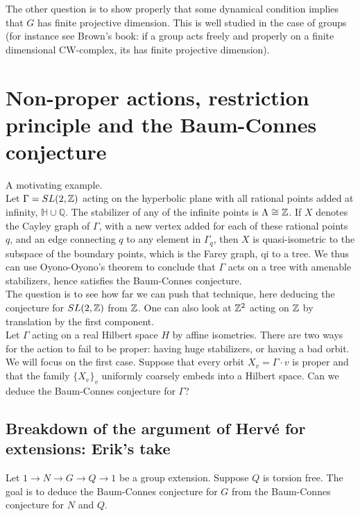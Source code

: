 The other question is to show properly that some dynamical condition implies that $G$ has finite projective dimension. This is well studied in the case of groups (for instance see Brown's book: if a group acts freely and properly on a finite dimensional CW-complex, its has finite projective dimension).
\newpage
\section{Non-proper actions, restriction principle and the Baum-Connes conjecture}  %

A motivating example.\\

Let $\Gamma = SL(2, \mathbb Z)$ acting on the hyperbolic plane with all rational points added at infinity, $\mathbb H \cup \mathbb Q$. The stabilizer of any of the infinite points is $\Lambda \cong \mathbb Z$. If $X$ denotes the Cayley graph of $\Gamma$, with a new vertex added for each of these rational points $q$, and an edge connecting $q$ to any element in $\Gamma_q$, then $X$ is quasi-isometric to the subspace of the boundary points, which is the Farey graph, qi to a tree. We thus can use Oyono-Oyono's theorem to conclude that $\Gamma$ acts on a tree with amenable stabilizers, hence satisfies the Baum-Connes conjecture.\\

The question is to see how far we can push that technique, here deducing the conjecture for $SL(2,\mathbb Z)$ from $\mathbb Z$. One can also look at $\mathbb Z^2$ acting on $\mathbb Z$ by translation by the first component.\\

Let $\Gamma$ acting on a real Hilbert space $H$ by affine isometries. There are two ways for the action to fail to be proper: having huge stabilizers, or having a bad orbit. We will focus on the first case. Suppose that every orbit $X_v= \Gamma \cdot v$ is proper and that the family $\{X_v\}_v$ uniformly coarsely embeds into a Hilbert space. Can we deduce the Baum-Connes conjecture for $\Gamma$? 

\subsection{Breakdown of the argument of Herv\'e for extensions: Erik's take}

Let $1 \rightarrow N \rightarrow G \rightarrow Q \rightarrow 1$ be a group extension. Suppose $Q$ is torsion free. The goal is to deduce the Baum-Connes conjecture for $G$ from the Baum-Connes conjecture for $N$ and $Q$.\\

